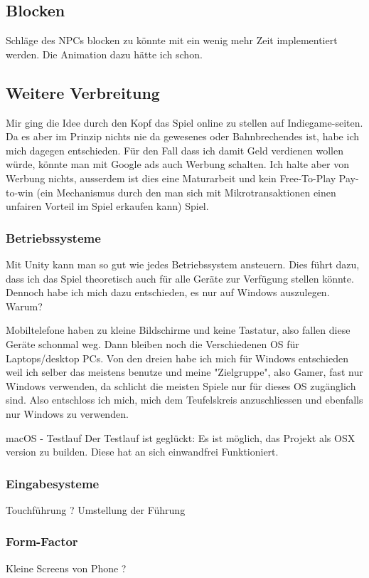 \subsection{Blocken}
Schläge des NPCs blocken zu könnte mit ein wenig mehr Zeit implementiert werden.
Die Animation dazu hätte ich schon.
\subsection{Weitere Verbreitung}

Mir ging die Idee durch den Kopf das Spiel online zu stellen auf Indiegame-seiten.
Da es aber im Prinzip nichts nie da gewesenes oder Bahnbrechendes ist, habe ich mich dagegen entschieden.
Für den Fall dass ich damit Geld verdienen wollen würde, könnte man mit Google ads auch Werbung schalten.
Ich halte aber von Werbung nichts, ausserdem ist dies eine Maturarbeit und kein Free-To-Play Pay-to-win 
(ein Mechanismus durch den man sich mit Mikrotransaktionen einen unfairen Vorteil im Spiel erkaufen kann) 
Spiel.

\subsubsection{Betriebssysteme}
Mit Unity kann man so gut wie jedes Betriebssystem ansteuern.
Dies führt dazu, dass ich das Spiel theoretisch auch für alle Geräte zur Verfügung stellen könnte. 
Dennoch habe ich mich dazu entschieden, es nur auf Windows auszulegen.
Warum?

Mobiltelefone haben zu kleine Bildschirme und keine Tastatur, also fallen diese Geräte schonmal weg.
Dann bleiben noch die Verschiedenen OS für Laptops/desktop PCs.
Von den dreien habe ich mich für Windows entschieden weil ich selber das meistens benutze und meine "Zielgruppe", also Gamer, fast nur Windows verwenden, da schlicht die meisten Spiele nur für dieses OS zugänglich sind.
Also entschloss ich mich, mich dem Teufelskreis anzuschliessen und ebenfalls nur Windows zu verwenden.

macOS - Testlauf
Der Testlauf ist geglückt: Es ist möglich, das Projekt als OSX version zu builden. Diese hat an sich einwandfrei Funktioniert.


\subsubsection{Eingabesysteme}

Touchführung ? Umstellung der Führung

\subsubsection{Form-Factor}

Kleine Screens von Phone ?